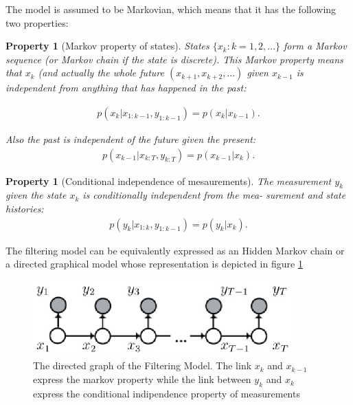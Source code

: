 The model is assumed to be Markovian, which means that it has the following two properties:
\newtheorem{thm1}{Property}[section]

\begin{thm1} [Markov property of states]
States $\{x_k : k = 1, 2, . . .\}$ form a Markov sequence (or Markov chain if the state
is discrete). This Markov property means that $x_k$ (and actually the whole future
$(x_{k+1} , x_{k+2} , . . .)$ given $x_{k-1}$ is independent from anything that has happened in the past:

\begin{eqnarray} \label{eqn: Indipendence State1}
p(x_k | x_{1:k−1} , y_{1:k−1} ) = p(x_k | x_{k-1} ).
\end{eqnarray}

Also the past is independent of the future given the present:
\begin{eqnarray} \label{eqn: Indipendence State2}
p(x_{k-1} | x_{k:T} , y_{k:T} ) = p(x_{k-1} | x_k ).
\end{eqnarray}
\end{thm1} 

\newtheorem{thm2}{Property}[section]

\begin{thm2} [Conditional independence of mesaurements]
The measurement $y_k$ given the state $x_k$ is conditionally independent from the mea-
surement and state histories:
 \begin{eqnarray} \label{eqn: Indipendence Measurement}
 p(y_{k} | x_{1:k} , y_{1:k-1} ) = p(y_k | x_k ).
 \end{eqnarray}
\end{thm2}

The filtering model can be equivalently expressed as an Hidden Markov chain or a directed  graphical model whose representation is depicted in figure \ref{fig:GM}
\begin{figure}[!htb]\label{fig:GM}
\begin{center}
 \includegraphics[width=10cm]{./ImaginiLatex/gm_directed.eps} 
\end{center}
\caption{The directed graph of the Filtering Model. The link  $x_k$ and $x_{k-1}$ express the markov property while the link between $y_k$ and $x_k$ express the conditional indipendence property of measurements}

\end{figure}

